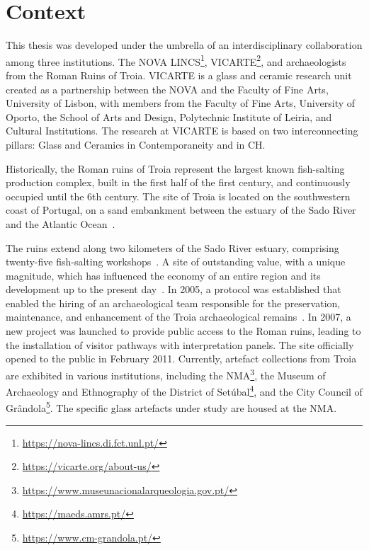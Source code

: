 \section{Context}
\label{sec:context}

This thesis was developed under the umbrella of an interdisciplinary collaboration among three institutions.
The NOVA LINCS\footnote{\url{https://nova-lincs.di.fct.unl.pt/}}, \gls{VICARTE}\footnote{\url{https://vicarte.org/about-us/}}, and archaeologists from the Roman Ruins of Troia.
\gls{VICARTE} is a glass and ceramic research unit created as a partnership between the \gls{NOVA} and the Faculty of Fine Arts, University of Lisbon, with members from the Faculty of Fine Arts, University of Oporto, the School of Arts and Design, Polytechnic Institute of Leiria, and Cultural Institutions.
The research at \gls{VICARTE} is based on two interconnecting pillars: Glass and Ceramics in Contemporaneity and in \gls{CH}. 

Historically, the Roman ruins of Troia represent the largest known fish-salting production complex, built in the first half of the first century, and continuously occupied until the 6th century. 
The site of Troia is located on the southwestern coast of Portugal, on a sand embankment between the estuary of the Sado River and the Atlantic Ocean~\cite{pinto2018reassessment}.

The ruins extend along two kilometers of the Sado River estuary, comprising twenty-five fish-salting workshops~\cite{hocquet2015fish}.
A site of outstanding value, with a unique magnitude, which has influenced the economy of an entire region and its development up to the present day~\cite{unesco_troia}.
In 2005, a protocol was established that enabled the hiring of an archaeological team responsible for the preservation, maintenance, and enhancement of the Troia archaeological remains~\cite{pinto2014ruinas}. In 2007,
a new project was launched to provide public access to the Roman ruins, leading to the installation of visitor pathways with interpretation panels. The site officially opened to the public in February 2011. 
Currently, artefact collections from Troia are exhibited in various institutions, including the \gls{NMA}\footnote{\url{https://www.museunacionalarqueologia.gov.pt/}}, the Museum of Archaeology and Ethnography of the District of Setúbal\footnote{\url{https://maeds.amrs.pt/}}, and the City Council of Grândola\footnote{\url{https://www.cm-grandola.pt/}}. The specific glass artefacts under study are housed at the \gls{NMA}.



